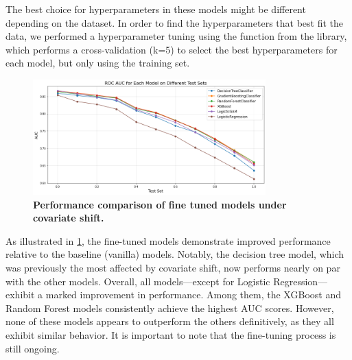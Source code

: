 The best choice for hyperparameters in these models might be different depending on the dataset. In order to find the hyperparameters that best fit the data, we performed a hyperparameter tuning using the  function from the  library, which performs a cross-validation (k=5) to select the best hyperparameters for each model, but only using the training set.
\begin{figure}[H]
    \centering
    \includegraphics[width=0.8\textwidth]{assets/tuned.png} 
    \caption{\textbf{Performance comparison of fine tuned models under covariate shift.}}
    \label{fig:tuned-models-perf}
\end{figure}

As illustrated in \cref{fig:tuned-models-perf}, the fine-tuned models demonstrate improved performance relative to the baseline (vanilla) models. Notably, the decision tree model, which was previously the most affected by covariate shift, now performs nearly on par with the other models. Overall, all models—except for Logistic Regression—exhibit a marked improvement in performance. Among them, the XGBoost and Random Forest models consistently achieve the highest AUC scores. However, none of these models appears to outperform the others definitively, as they all exhibit similar behavior. It is important to note that the fine-tuning process is still ongoing.

